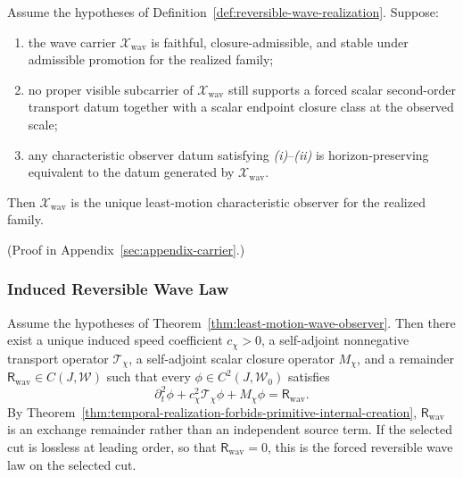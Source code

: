 \begin{theorem}
\label{thm:least-motion-wave-observer}
Assume the hypotheses of Definition~\ref{def:reversible-wave-realization}.
Suppose:
\begin{enumerate}[label=(\roman*),itemsep=0.2em]
\item the wave carrier \(\mathcal X_{\mathrm{wav}}\) is faithful,
      closure-admissible, and stable under admissible promotion for the
      realized family;
\item no proper visible subcarrier of \(\mathcal X_{\mathrm{wav}}\) still
      supports a forced scalar second-order transport datum together with a
      scalar endpoint closure class at the observed scale;
\item any characteristic observer datum satisfying \emph{(i)}--\emph{(ii)} is
      horizon-preserving equivalent to the datum generated by
      \(\mathcal X_{\mathrm{wav}}\).
\end{enumerate}
Then \(\mathcal X_{\mathrm{wav}}\) is the unique least-motion characteristic
observer for the realized family.
\end{theorem}

(Proof in Appendix~\ref{sec:appendix-carrier}.)

\subsubsection{Induced Reversible Wave Law}

\begin{theorem}
\label{thm:induced-wave-law}
Assume the hypotheses of
Theorem~\ref{thm:least-motion-wave-observer}. Then there exist a unique induced
speed coefficient \(c_{\chi}>0\), a self-adjoint nonnegative transport operator
\(\mathcal T_{\chi}\), a self-adjoint scalar closure operator \(M_{\chi}\), and
a remainder \(\mathsf R_{\mathrm{wav}}\in C(J,\mathcal W)\) such that every
\(\phi\in C^2(J,\mathcal W_0)\) satisfies
\[
\partial_t^2\phi
+
c_{\chi}^2\mathcal T_{\chi}\phi
+
M_{\chi}\phi
=
\mathsf R_{\mathrm{wav}}.
\]
By
Theorem~\ref{thm:temporal-realization-forbids-primitive-internal-creation},
\(\mathsf R_{\mathrm{wav}}\) is an exchange remainder rather than an
independent source term.
If the selected cut is lossless at leading order, so that
\(\mathsf R_{\mathrm{wav}}=0\), this is the forced reversible wave law on the
selected cut.
\end{theorem}

